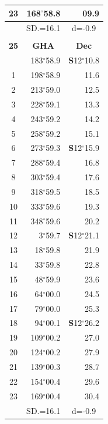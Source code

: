 \documentclass[10pt, a4paper]{report}
\begin{document}
\begin{scriptsize}
\begin{tabular*}{0.2\textwidth}[t]{@{\extracolsep{\fill}}|c|rr|}
23 & 168$^\circ$58.8 & 09.9\\
\hline
\rule{0pt}{2.4ex} & \multicolumn{1}{c}{SD.=16.1} & \multicolumn{1}{c|}{d=-0.9}\\
\hline
\multicolumn{1}{c}{}\\[-0.5ex]\hline
\multicolumn{1}{|c|}{\rule{0pt}{2.6ex}\textbf{25}} & \multicolumn{1}{c}{\textbf{GHA}} & \multicolumn{1}{c|}{\textbf{Dec}}\\
\hline\rule{0pt}{2.6ex}\noindent
0 & 183$^\circ$58.9 & \textbf{S}12$^\circ$10.8\\
1 & 198$^\circ$58.9 & 11.6\\
2 & 213$^\circ$59.0 & 12.5\\
3 & 228$^\circ$59.1 & \raisebox{0.24ex}{\boldmath$\cdot$~\boldmath$\cdot$~~}13.3\\
4 & 243$^\circ$59.2 & 14.2\\
5 & 258$^\circ$59.2 & 15.1\\[2Pt]
6 & 273$^\circ$59.3 & \textbf{S}12$^\circ$15.9\\
7 & 288$^\circ$59.4 & 16.8\\
8 & 303$^\circ$59.4 & 17.6\\
9 & 318$^\circ$59.5 & \raisebox{0.24ex}{\boldmath$\cdot$~\boldmath$\cdot$~~}18.5\\
10 & 333$^\circ$59.6 & 19.3\\
11 & 348$^\circ$59.6 & 20.2\\[2Pt]
12 & 3$^\circ$59.7 & \textbf{S}12$^\circ$21.1\\
13 & 18$^\circ$59.8 & 21.9\\
14 & 33$^\circ$59.8 & 22.8\\
15 & 48$^\circ$59.9 & \raisebox{0.24ex}{\boldmath$\cdot$~\boldmath$\cdot$~~}23.6\\
16 & 64$^\circ$00.0 & 24.5\\
17 & 79$^\circ$00.0 & 25.3\\[2Pt]
18 & 94$^\circ$00.1 & \textbf{S}12$^\circ$26.2\\
19 & 109$^\circ$00.2 & 27.0\\
20 & 124$^\circ$00.2 & 27.9\\
21 & 139$^\circ$00.3 & \raisebox{0.24ex}{\boldmath$\cdot$~\boldmath$\cdot$~~}28.7\\
22 & 154$^\circ$00.4 & 29.6\\
23 & 169$^\circ$00.4 & 30.4\\
\hline
\rule{0pt}{2.4ex} & \multicolumn{1}{c}{SD.=16.1} & \multicolumn{1}{c|}{d=-0.9}\\
\hline
\end{tabular*}\noindent

\end{scriptsize}
\end{document}
